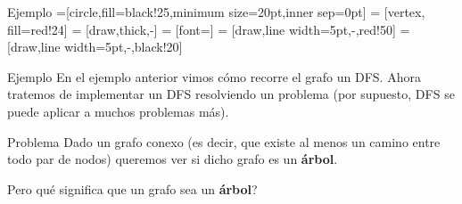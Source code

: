 \documentclass[compress]{beamer}
\begin{document}
\begin{frame}{Ejemplo}
=[circle,fill=black!25,minimum size=20pt,inner sep=0pt]
 = [vertex, fill=red!24]
 = [draw,thick,-]
 = [font=\small]
 = [draw,line width=5pt,-,red!50]
 = [draw,line width=5pt,-,black!20]

\begin{figure}
\end{figure}
\end{frame}


\begin{frame}{Ejemplo}
En el ejemplo anterior vimos cómo recorre el grafo un DFS. Ahora tratemos de implementar un DFS resolviendo un problema (por supuesto, DFS se puede aplicar a muchos problemas más).

\begin{block}{Problema}
Dado un grafo conexo (es decir, que existe al menos un camino entre todo par de nodos) queremos ver si dicho grafo es un {\bf árbol}.
\end{block}

\textquestiondown Pero qué significa que un grafo sea un {\bf árbol}?
\end{frame}
\end{document}
